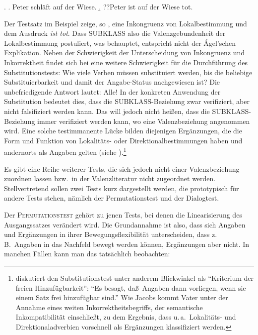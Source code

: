\ex. 
\a. Peter schläft auf der Wiese.
\b. ??Peter ist auf der Wiese tot.

Der Testsatz im Beispiel zeige, so \citet[188]{Agel:00}, eine Inkongruenz von Lokalbestimmung und dem Ausdruck {\it ist tot}. Dass SUBKLASS also die Valenzgebundenheit der Lokalbestimmung postuliert, was \citet[26]{Jacobs:94} behauptet, entspricht nicht der \'Agel'schen Explikation. Neben der Schwierigkeit der Unterscheidung von Inkongruenz und Inkorrektheit findet sich bei \citet[66f]{Storrer:92} eine weitere Schwierigkeit für die Durchführung des Substitutionstests: Wie viele Verben müssen substituiert werden, bis die beliebige Substituierbarkeit und damit der Angabe-Status nachgewiesen ist? Die unbefriedigende Antwort lautet: Alle! In der konkreten Anwendung der Substitution bedeutet dies, dass die SUBKLASS-Beziehung zwar verifiziert, aber nicht falsifiziert werden kann. Das will jedoch nicht hei\ss en, dass die SUBKLASS-Beziehung immer verifiziert werden kann, wo eine Valenzbeziehung angenommen wird. Eine solche testimmanente Lücke bilden diejenigen Ergänzungen, die die Form und Funktion von Lokalitäts- oder Direktionalbestimmungen haben und andernorts als Angaben gelten (siehe \citealt[360f]{Zifonun:03}).\footnote{\citet[16f]{Vater:81} diskutiert den Substitutionstest unter anderem Blickwinkel als "`Kriterium der freien Hinzufügbarkeit"': "`Es besagt, da\ss\ Angaben dann vorliegen, wenn sie einem Satz frei hinzufügbar sind."' Wie Jacobs kommt Vater unter der Annahme eines weiten Inkorrektheitsbegriffs, der semantische Inkompatibilität einschlie\ss t, zu dem Ergebnis, dass u.\,a.\ Lokalitäts- und Direktionaladverbien vorschnell als Ergänzungen klassifiziert werden.}    %






Es gibt eine Reihe weiterer Tests, die sich jedoch nicht einer Valenzbeziehung zuordnen lassen bzw.\ in der Valenzliteratur nicht zugeordnet werden. Stellvertretend sollen zwei Tests kurz dargestellt werden, die prototypisch für andere Tests stehen, nämlich der Permutationstest und der Dialogtest. 

Der \textsc{Permutationstest} gehört zu jenen Tests, bei denen die Linearisierung des Ausgangssatzes verändert wird. Die Grundannahme ist also, dass sich Angaben und Ergänzungen in ihrer Bewegungsflexibilität unterscheiden, dass z.\,B.\ Angaben in das Nachfeld bewegt werden können, Ergänzungen aber nicht. In manchen Fällen kann man das tatsächlich beobachten: 
 
